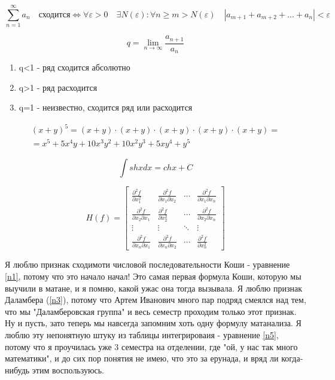 \documentclass[12pt, a4paper]{article}
\renewcommand{\ge}{\geqslant}
\begin{document}
\begin{equation} \label{n2}
\sum_{n=1}^{\infty} a_n \quad \text{сходится}  \Leftrightarrow  \forall \varepsilon > 0 \quad  \exists N(\varepsilon) : \forall n \ge m > N(\varepsilon) \quad |a_{m+1}+a_{m+2}+...+a_n|< \varepsilon 
\end{equation}

\begin{equation} \label{n3}
q = \lim_{n \to \infty} \frac{a_{n+1}}{a_n} 
\end{equation}

\begin{enumerate}
\item q<1 - ряд сходится абсолютно
\item q>1 - ряд расходится
\item q=1 - неизвестно, сходится ряд или расходится
\end{enumerate}

\begin{multline} \label{n4}
	 (x + y)^5 = (x+y)\cdot(x+y)\cdot(x+y)\cdot(x+y)\cdot(x+y) = \\
	 = x^5 + 5x^4y + 10x^3y^2 + 10x^2y^3 + 5xy^4 + y^5 
\end{multline}

\begin{equation} \label{n5}
 \int sh x dx = ch x + C 
\end{equation}

\begin{equation} \label{n6}
H(f) =
 \begin{bmatrix}
   \frac{\partial^2f}{\partial x_1^2} & \frac{\partial^2f}{\partial x_1 \partial x_2} & \cdots &  \frac{\partial^2f}{\partial x_1\partial x_n}  \\
  \frac{\partial^2f}{\partial x_2\partial x_1} & \frac{\partial^2f}{\partial x_2^2} & \cdots & \frac{\partial^2f}{\partial x_2\partial x_n}  \\
  \vdots  & \vdots  & \ddots & \vdots  \\
 \frac{\partial^2f}{\partial x_n\partial x_1}  & \frac{\partial^2f}{\partial x_n\partial x_2}  & \cdots & \frac{\partial^2f}{\partial x_n^2}
 \end{bmatrix}
\end{equation}


Я люблю признак сходимоти числовой последовательности Коши - уравнение \ref{n1}, потому что это начало начал! Это самая первая формула Коши, которую мы выучили в матане, и я помню, какой ужас она тогда вызывала. Я люблю признак Даламбера (\ref{n3}), потому что Артем Иванович много пар подряд смеялся над тем, что мы "Даламберовская группа" и весь семестр проходим только этот признак. Ну и пусть, зато теперь мы навсегда запомним хоть одну формулу матанализа. Я люблю эту непонятную штуку из таблицы интегрироваия - уравнение \ref{n5}, потому что я проучилась уже 3 семестра на отделении, где "ой, у нас так много математики", и до сих пор понятия не имею, что это за ерунада, и вряд ли когда-нибудь этим воспользуюсь.
\end{document}

